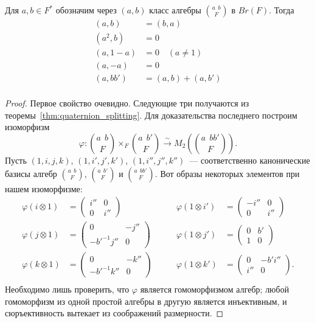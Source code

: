 \documentclass[a4paper,oneside,12pt]{article}
\theoremstyle{plain} { \swapnumbers
\newtheorem{theorem}{Теорема}[subsection]
\newtheorem{corollary}[theorem]{Следствие}
\newtheorem{lemma}[theorem]{Лемма}
\newtheorem{proposition}[theorem]{Утверждение}
\newtheorem{claim}[theorem]{Факт}
}
\theoremstyle{definition} { \swapnumbers
\newtheorem{definition}[theorem]{Определение}
\newtheorem{notation}[theorem]{Обозначение}
\newtheorem{remark}[theorem]{Замечание}
\newtheorem{remarks}[theorem]{Замечания}
\newtheorem{example}[theorem]{Пример}
\newtheorem{examples}[theorem]{Примеры}
\newtheorem{sssection}[theorem]{}
}
\def\ph{\varphi}
\def\quaternion#1#2#3{\binom{{#1}\:\:{#2}}{#3}}
\begin{document}
\begin{lemma}\label{lemma:relations_quaternion}
Для $a,b\in F^*$ обозначим через $(a,b)$ класс алгебры $\quaternion{a}{b}{F}$ в $Br(F)$. Тогда
$$
\begin{aligned}
(a,b)&=(b,a)\\
(a^2,b)&=0\\
(a,1-a)&=0\quad(a\neq 1)\\
(a,-a)&=0\\
(a,bb')&=(a,b)+(a,b')\\
\end{aligned}
$$
\end{lemma}
\begin{proof}
Первое свойство очевидно. Следующие три получаются из теоремы~\ref{thm:quaternion_splitting}.
Для доказательства последнего построим изоморфизм
$$
\ph\colon\quaternion{a}{b}{F}\times_F\quaternion{a}{b'}{F}\stackrel{\sim}{\longrightarrow} M_2\left(\quaternion{a}{bb'}{F}\right).
$$
Пусть $(1,i,j,k)$, $(1,i',j',k')$, $(1,i'',j'',k'')$~--- соответственно канонические базисы алгебр
$\quaternion{a}{b}{F}$, $\quaternion{a}{b'}{F}$ и $\quaternion{a}{bb'}{F}$. Вот
образы некоторых элементов при нашем изоморфизме:
$$
\begin{aligned}
\ph(i\otimes 1)&=\begin{pmatrix}i''&0\\0&i''\end{pmatrix}\qquad & 
\ph(1\otimes i')&=\begin{pmatrix}-i''&0\\0&i''\end{pmatrix}\\
\ph(j\otimes 1)&=\begin{pmatrix}0&-j''\\-b'^{-1}j''&0\end{pmatrix}\qquad & 
\ph(1\otimes j')&=\begin{pmatrix}0&b'\\1&0\end{pmatrix}\\
\ph(k\otimes 1)&=\begin{pmatrix}0&-k''\\-b'^{-1}k''&0\end{pmatrix}\qquad & 
\ph(1\otimes k')&=\begin{pmatrix}0&-b'i''\\i''&0\end{pmatrix}.\\
\end{aligned}
$$
Необходимо лишь проверить, что $\ph$ является гомоморфизмом алгебр; любой гомоморфизм из одной простой алгебры
в другую является инъективным, и сюръективность вытекает из соображений размерности.
\end{proof}
\end{document}
